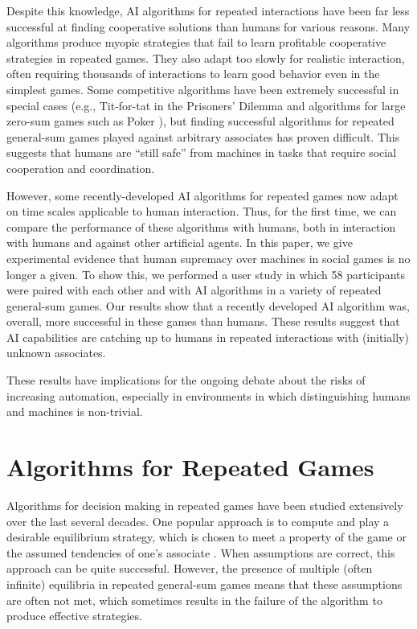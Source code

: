 \documentclass[fleqn,10pt]{SelfArx}
\begin{document}
Despite this knowledge, AI algorithms for repeated interactions have been far less successful at finding cooperative solutions than humans for various reasons. Many algorithms produce myopic strategies that fail to learn profitable cooperative strategies in repeated games. They also adapt too slowly for realistic interaction, often requiring thousands of interactions to learn good behavior even in the simplest games. Some competitive algorithms have been extremely successful in special cases (e.g., Tit-for-tat in the Prisoners' Dilemma  \cite{Axelrod:1984} and algorithms for large zero-sum games such as Poker \cite{PolarisPokerChampion}), but finding successful algorithms for repeated general-sum games played against arbitrary associates has proven difficult.  This suggests that humans are ``still safe'' from machines in tasks that require social cooperation and coordination.

However, some recently-developed AI algorithms for repeated games now adapt on time scales applicable to human interaction.  Thus, for the first time, we can compare the performance of these algorithms with humans, both in interaction with humans and against other artificial agents.  In this paper, we give experimental evidence that human supremacy over machines in social games is no longer a given.  To show this, we performed a user study in which 58 participants were paired with each other and with AI algorithms in a variety of repeated general-sum games.  Our results show that a recently developed AI algorithm was, overall, more successful in these games than humans.  These results suggest that AI capabilities are catching up to humans in repeated interactions with (initially) unknown associates.

These results have implications for the ongoing debate about the risks of increasing automation, especially in environments in which distinguishing humans and machines is non-trivial.

\section{Algorithms for Repeated Games}
Algorithms for decision making in repeated games have been studied extensively over the last several decades.  One popular approach is to compute and play a desirable equilibrium strategy, which is chosen to meet a property of the game or the assumed tendencies of one's associate \cite{LittmanRepeatedNash,FolkEgal,Johansonetal2012}.   When assumptions are correct, this approach can be quite successful.  However, the presence of multiple (often infinite) equilibria in repeated general-sum games means that these assumptions are often not met, which sometimes results in the failure of the algorithm to produce effective strategies.
\end{document}
